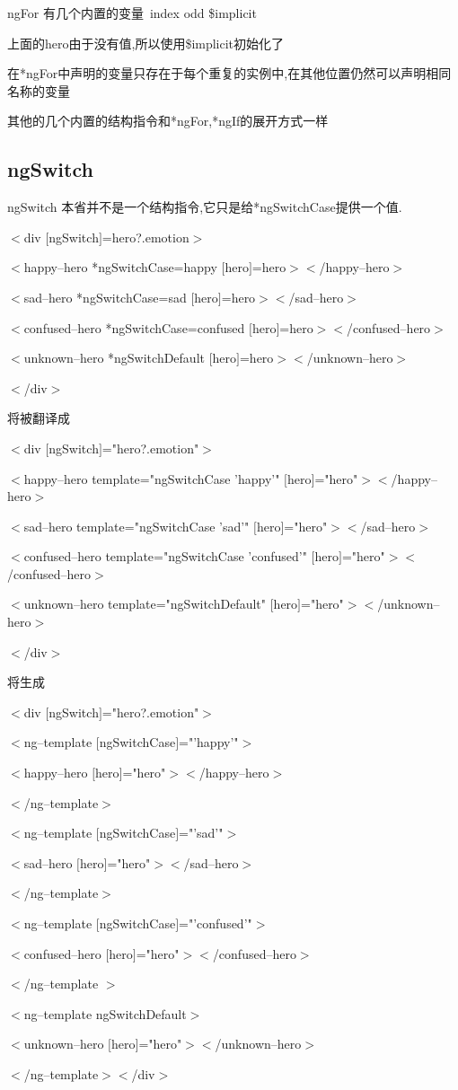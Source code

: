 \documentclass{article}
\begin{document}
\par *ngFor 有几个内置的变量\ index odd \$implicit
\par 上面的hero由于没有值,所以使用\$implicit初始化了
\par 在*ngFor中声明的变量只存在于每个重复的实例中,在其他位置仍然可以声明相同名称的变量
\par 其他的几个内置的结构指令和*ngFor,*ngIf的展开方式一样

\subsection{ngSwitch}

ngSwitch 本省并不是一个结构指令,它只是给*ngSwitchCase提供一个值.


$<$div $[$ngSwitch$]$=hero?.emotion$>$  
\par $<$happy--hero *ngSwitchCase=happy $[$hero$]$=hero$>$$<$/happy--hero$>$
\par $<$sad--hero *ngSwitchCase=sad $[$hero$]$=hero$>$$<$/sad--hero$>$  
\par $<$confused--hero *ngSwitchCase=confused $[$hero$]$=hero$>$$<$/confused--hero$>$
\par $<$unknown--hero *ngSwitchDefault $[$hero$]$=hero$>$$<$/unknown--hero$>$
\par $<$/div$>$

将被翻译成

$<$div $[$ngSwitch$]$="hero?.emotion"$>$
\par $<$happy--hero template="ngSwitchCase 'happy'" $[$hero$]$="hero"$>$$<$/happy--hero$>$ 
\par $<$sad--hero template="ngSwitchCase 'sad'" $[$hero$]$="hero"$>$$<$/sad--hero$>$ 
\par $<$confused--hero template="ngSwitchCase 'confused'" $[$hero$]$="hero"$>$$<$/confused--hero$>$
\par $<$unknown--hero template="ngSwitchDefault" $[$hero$]$="hero"$>$$<$/unknown--hero$>$
\par $<$/div$>$

将生成

$<$div $[$ngSwitch$]$="hero?.emotion"$>$ 
\par $<$ng--template $[$ngSwitchCase$]$="'happy'"$>$ 
\par $<$happy--hero $[$hero$]$="hero"$>$$<$/happy--hero$>$ 
\par $<$/ng--template$>$  
\par $<$ng--template $[$ngSwitchCase$]$="'sad'"$>$ 
\par $<$sad--hero $[$hero$]$="hero"$>$$<$/sad--hero$>$
\par $<$/ng--template$>$
\par $<$ng--template $[$ngSwitchCase$]$="'confused'"$>$
\par $<$confused--hero $[$hero$]$="hero"$>$$<$/confused--hero$>$ 
\par $<$/ng--template $>$
\par $<$ng--template ngSwitchDefault$>$ 
\par $<$unknown--hero $[$hero$]$="hero"$>$$<$/unknown--hero$>$
\par $<$/ng--template$>$$<$/div$>$
\end{document}
